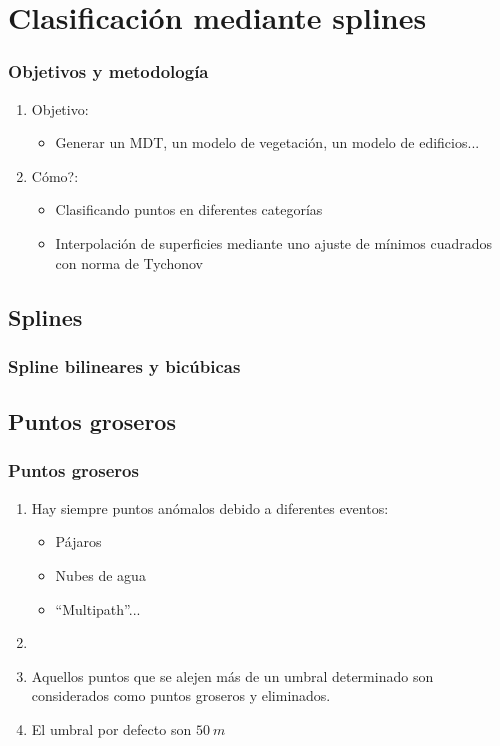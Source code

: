 \section{Clasificación mediante splines}
\begin{frame}
    \frametitle{Objetivos y metodología}
  \begin{enumerate}[<+->]
    \item Objetivo:
	\begin{itemize}
 	   \item Generar un MDT, un modelo de vegetación, un modelo de edificios...
	\end{itemize}
    \item \textquestiondown Cómo?:
	\begin{itemize}
 	  \item Clasificando puntos en diferentes categorías
	  \item Interpolación de superficies mediante uno ajuste de mínimos cuadrados con norma de Tychonov
	\end{itemize}
   \end{enumerate}
\end{frame}
\subsection{Splines}
\begin{frame}
    \frametitle{Spline bilineares y bicúbicas}
\end{frame}
\subsection{Puntos groseros}
\begin{frame}
   \frametitle{Puntos groseros}
   \begin{enumerate}
    \item Hay siempre puntos anómalos debido a diferentes eventos:
     \begin{itemize}
 	\item<2-> \alert<2,5>{Pájaros}
 	\item<3-> \alert<3,5>{Nubes de agua}
 	\item<4-> \alert<4,5>{``Multipath''}...
     \end{itemize}
    \item {} 
    \item<7-> Aquellos puntos que se alejen más de un umbral determinado son considerados como puntos groseros y eliminados.
    \item<8-> El umbral por defecto son \alert<8>{$50~m$}
   \end{enumerate}
\end{frame}
